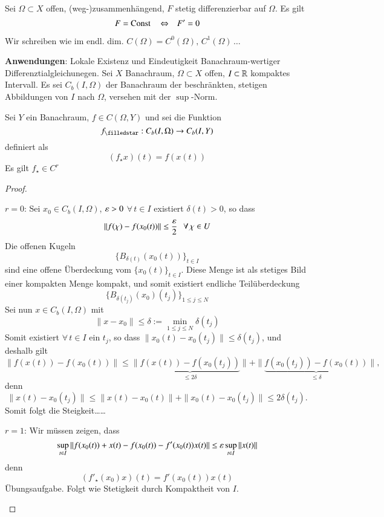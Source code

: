 \begin{cor}\label{1.16}
    Sei $\Omega \subset X$ offen, (weg-)zusammenhängend, $F$ stetig differenzierbar auf $\Omega$.
    Es gilt
    \[
        F= \mathrm{Const} \, \hspace{.25cm} \Leftrightarrow \hspace{.25cm} F'=0
    \]
\end{cor}
\begin{remark}
    Wir schreiben wie im endl. dim. $C(\Omega)= C^0(\Omega), \, C^1(\Omega)\, …$
\end{remark}

\noindent \textbf{Anwendungen}: Lokale Existenz und Eindeutigkeit Banachraum-wertiger
Differenztialgleichunegen. Sei $X$ Banachraum, $\Omega\subset X$ offen, $I\subset \mathbb{R}$
kompaktes Intervall. Es sei $C_b(I,\Omega)$ der Banachraum der beschränkten, stetigen Abbildungen
von $I$ nach $\Omega$, versehen mit der $\sup$-Norm.

\begin{lem}
    Sei $Y$ ein Banachraum, $f\in C(\Omega,Y)$ und sei die Funktion
    \[
        f_\star: C_b(I,\Omega)\ra C_b(I,Y)
    \]
    definiert als
    \[
        (f_\star x)(t)= f(x(t))
    \]
    Es gilt $f_\star\in C^r$
\end{lem}

\begin{proof}
    \begin{description}
    \item{$r=0$:}
    Sei $x_0\in C_b(I,\Omega)$, $\varepsilon>0$ $\forall \, t \in I$ existiert $\delta(t)>0$, so dass
    \[
        \|f(\chi)-f(x_0(t))\|\leq \frac{\varepsilon}{2} \hspace{.25cm} \forall \, \chi\in U
    \]
    Die offenen Kugeln 
    \[
        \{ B_{\delta(t)}(x_0(t)) \}_{t\in I}
    \]
    sind eine offene Überdeckung vom $\{ x_0(t) \}_{t\in I}$. Diese Menge ist als stetiges Bild einer
    kompakten Menge kompakt, und somit existiert endliche Teilüberdeckung
    \[
        \{ B_{\delta(t_j)}(x_0)(t_j) \}_{1\leq j \leq N}
    \]
    Sei nun $x\in C_b(I,\Omega)$ mit
    \[
        \|x-x_0\|\leq \delta := \min_{1\leq j \leq N}\delta(t_j)
    \]
    Somit existiert $\forall \, t\in I$ ein $t_j$, so dass $\|x_0(t)-x_0(t_j)\|\leq \delta(t_j)$,
    und deshalb gilt
    \[
        \|f(x(t))- f(x_0(t))\|\leq \|\underbrace{f(x(t))-f(x_0(t_j))}_{\leq 2\delta}\|
        +\|\underbrace{f(x_0(t_j))-f(x_0(t))}_{\leq\delta}\|,
    \]
    denn
    \[
        \|x(t)-x_0(t_j)\|\leq \|x(t)-x_0(t)\|+\|x_0(t)-x_0(t_j)\|\leq 2\delta(t_j).
    \]
    Somit folgt die Steigkeit……
    \item{$r=1$:}
    Wir müssen zeigen, dass
    \[
        \sup_{t\in I} \|f(x_0(t))+x(t)- f(x_0(t)) - f'(x_0(t))x(t)\|\leq \varepsilon \sup_{t\in I}\|x(t)\|
    \]
    denn
    \[
        (f'_\star(x_0)x)(t)= f'(x_0(t))x(t)
    \]
    Übungsaufgabe. Folgt wie Stetigkeit durch Kompaktheit von $I$.
    \end{description}
    \[  \]
\end{proof}
